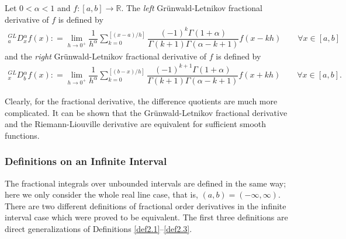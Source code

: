 \documentclass[leqno,final]{siamltex}
\numberwithin{equation}{section}
\renewcommand{\(}{\bigl(}
\renewcommand{\)}{\bigr)}
\newcommand{\R}{\mathbb{R}}
\begin{document}
            \begin{definition}  
               Let $0 < \alpha <1$ and $f:[a,b] \rightarrow \R$. The \textit{left} Gr\"{u}nwald-Letnikov fractional derivative of $f$ is defined by
                \begin{align*}
                    {^{GL}_{a}}{D}{^{\alpha}_{x}} f(x) : = \lim_{h \rightarrow 0^+} \dfrac{1}{h^{\alpha}} \sum_{k = 0 }^{[(x-a)/h]} \dfrac{(-1)^{k} \Gamma(1 + \alpha)}{\Gamma(k+1) \Gamma(\alpha - k +1)} f(x - kh) \qquad \forall x \in [a,b ]
                \end{align*}
                and the \textit{right} Gr\"{u}nwald-Letnikov fractional derivative of $f$ is defined by
                \begin{align*}
                    {^{GL}_{x}}{D}{^{\alpha}_{b}} f(x) : = \lim_{h \rightarrow 0^+} \dfrac{1}{h^{\alpha}} \sum_{k = 0 }^{[(b-x)/h]} \dfrac{(-1)^{k+1} \Gamma(1 + \alpha)}{\Gamma(k+1) \Gamma(\alpha - k +1)} f(x + kh) \qquad \forall x \in [a,b].
                \end{align*}
            \end{definition}

            Clearly, for the fractional derivative, the difference quotients are much more complicated. It can be shown \cite{Samko} that the Gr\"{u}nwald-Letnikov fractional derivative and the Riemann-Liouville derivative are equivalent for sufficient smooth functions. 
        

        \subsubsection{\bf Definitions on an Infinite Interval}\label{sec-2.1.2} 
            The fractional integrals over unbounded intervals are defined in the same way; here we only consider the whole real line case, that is,  $(a,b)=(-\infty, \infty)$. 
            There are two different definitions of fractional order derivatives in the infinite interval case which were proved to be equivalent. The first three definitions are direct generalizations of Definitions \ref{def2.1}--\ref{def2.3}. 
\end{document}
